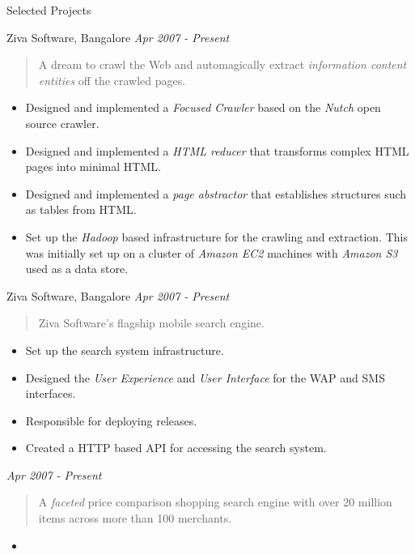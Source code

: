 \documentclass{resume}
\newcommand{\period}{\hfill\small\sl}
\begin{document}
\begin{category}{Selected Projects}

     Ziva Software, Bangalore {\period Apr 2007 - Present}
    \begin{quote}
        A dream to crawl the Web and automagically extract {\em information content entities} off the crawled pages.
    \end{quote}
    \begin{itemize}
        \item Designed and implemented a {\em Focused Crawler} based on the {\em Nutch} open source crawler.
        \item Designed and implemented a {\em HTML reducer} that transforms complex HTML pages into minimal HTML.
        \item Designed and implemented a {\em page abstractor} that establishes structures such as tables from HTML.
        \item Set up the {\em Hadoop} based infrastructure for the crawling and extraction.
            This was initially set up on a cluster of {\em Amazon EC2} machines with {\em Amazon S3} used as a data store.
    \end{itemize}

     Ziva Software, Bangalore {\period Apr 2007 - Present}
    \begin{quote}
        Ziva Software's flagship mobile search engine.
    \end{quote}
    \begin{itemize}
        \item Set up the search system infrastructure.
        \item Designed the {\em User Experience} and {\em User Interface} for the WAP and SMS interfaces.
        \item Responsible for deploying releases.
        \item Created a HTTP based API for accessing the search system.
    \end{itemize}

     {\period Apr 2007 - Present}
    \begin{quote}
        A {\em faceted} price comparison shopping search engine with over 20 million items across more than 100 merchants.
    \end{quote}
    \begin{itemize}
        \item
    \end{itemize}

\end{category}
\end{document}
